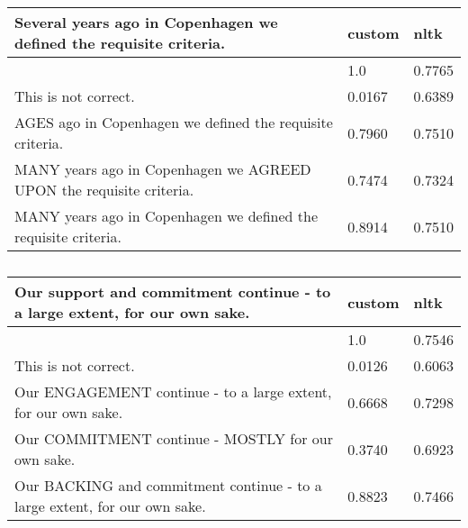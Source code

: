 \documentclass[a4paper]{article}
\begin{document}
\begin{table}
  \caption{}
\end{table}

\begin{table}
  \begin{tabular}{l l l}
    \toprule
    Several years ago in Copenhagen we defined the requisite criteria. & custom & nltk \\
    \midrule
                                                                       & 1.0 & 0.7765 \\
    This is not correct. & 0.0167 & 0.6389 \\
    AGES ago in Copenhagen we defined the requisite criteria. & 0.7960 & 0.7510 \\
    MANY years ago in Copenhagen we AGREED UPON the requisite criteria. & 0.7474 & 0.7324 \\
    MANY years ago in Copenhagen we defined the requisite criteria. & 0.8914 & 0.7510 \\
    \bottomrule
  \end{tabular}
  \caption{}
\end{table}

\begin{table}
  \begin{tabular}{l l l}
    \toprule
    Our support and commitment continue - to a large extent, for our own sake. & custom & nltk \\
    \midrule
                                                                               & 1.0 & 0.7546 \\
    This is not correct. & 0.0126 & 0.6063 \\
    Our ENGAGEMENT continue - to a large extent, for our own sake. & 0.6668 & 0.7298 \\
    Our COMMITMENT continue - MOSTLY for our own sake. & 0.3740 & 0.6923 \\
    Our BACKING and commitment continue - to a large extent, for our own sake. & 0.8823 & 0.7466 \\
    \bottomrule
  \end{tabular}
  \caption{}
\end{table}
\end{document}
